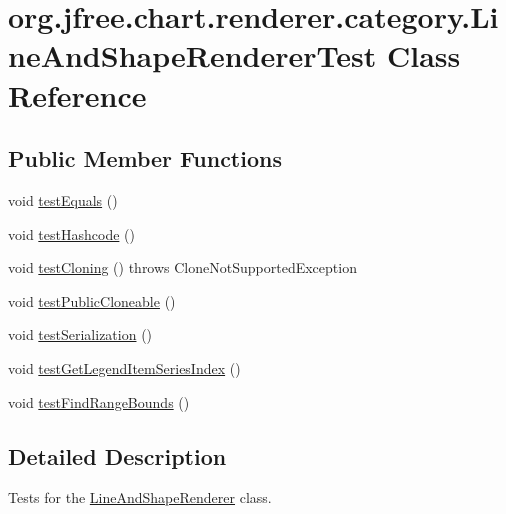 \hypertarget{classorg_1_1jfree_1_1chart_1_1renderer_1_1category_1_1_line_and_shape_renderer_test}{}\section{org.\+jfree.\+chart.\+renderer.\+category.\+Line\+And\+Shape\+Renderer\+Test Class Reference}
\label{classorg_1_1jfree_1_1chart_1_1renderer_1_1category_1_1_line_and_shape_renderer_test}
\subsection*{Public Member Functions}
\begin{DoxyCompactItemize}
\item 
void \mbox{\hyperlink{classorg_1_1jfree_1_1chart_1_1renderer_1_1category_1_1_line_and_shape_renderer_test_a98128fb5bf8aee2ae58222e1eeadef1f}{test\+Equals}} ()
\item 
void \mbox{\hyperlink{classorg_1_1jfree_1_1chart_1_1renderer_1_1category_1_1_line_and_shape_renderer_test_abeb64f4a5645d4a4961b9c5b5fec2b61}{test\+Hashcode}} ()
\item 
void \mbox{\hyperlink{classorg_1_1jfree_1_1chart_1_1renderer_1_1category_1_1_line_and_shape_renderer_test_a405dc26b374f9c4a52b1946c829063cf}{test\+Cloning}} ()  throws Clone\+Not\+Supported\+Exception 
\item 
void \mbox{\hyperlink{classorg_1_1jfree_1_1chart_1_1renderer_1_1category_1_1_line_and_shape_renderer_test_ae89f924b5e3cca21c767827b15ae0a01}{test\+Public\+Cloneable}} ()
\item 
void \mbox{\hyperlink{classorg_1_1jfree_1_1chart_1_1renderer_1_1category_1_1_line_and_shape_renderer_test_a991fda9341ccca49d1682f97e5c3254c}{test\+Serialization}} ()
\item 
void \mbox{\hyperlink{classorg_1_1jfree_1_1chart_1_1renderer_1_1category_1_1_line_and_shape_renderer_test_a4b5f991815a13e8097069c96be676997}{test\+Get\+Legend\+Item\+Series\+Index}} ()
\item 
void \mbox{\hyperlink{classorg_1_1jfree_1_1chart_1_1renderer_1_1category_1_1_line_and_shape_renderer_test_ab4d62a569df6e8e557d9bcb1344bc558}{test\+Find\+Range\+Bounds}} ()
\end{DoxyCompactItemize}


\subsection{Detailed Description}
Tests for the \mbox{\hyperlink{classorg_1_1jfree_1_1chart_1_1renderer_1_1category_1_1_line_and_shape_renderer}{Line\+And\+Shape\+Renderer}} class. 

